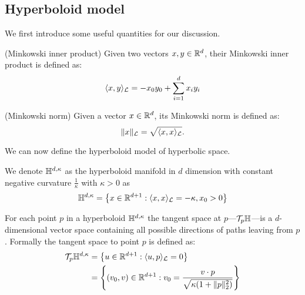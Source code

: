 

\subsection{Hyperboloid model}\label{sec:hyperboloidModel}
We first introduce some useful quantities for our discussion.

\begin{definition}(Minkowski inner product) \label{def:minkowskiInnerProduct}
    Given two vectors $x,y \in \mathbb{R}^d$, their Minkowski inner product is defined as:
    \begin{equation*}
        \langle x, y \rangle_{\mathcal{L}} = -x_0y_0+\sum_{i=1}^d x_iy_i
    \end{equation*}    
\end{definition}

\begin{definition}(Minkowski norm) \label{def:minkowskiNorm}
    Given a vector $x \in \mathbb{R}^d$, its Minkowski norm is defined as:
    \begin{equation*}
        \|x\|_{\mathcal{L}} = \sqrt{\langle x, x \rangle_{\mathcal{L}}}.
    \end{equation*}
\end{definition}

We can now define the hyperboloid model of hyperbolic space.
\begin{definition}
    We denote $\mathbb{H}^{d,\kappa}$ as the hyperboloid manifold in $d$ dimension with constant negative curvature $\frac{1}{\kappa}$ with $\kappa>0$ as
    \begin{equation*}
        \mathbb{H}^{d,\kappa} = \left\{x \in \mathbb{R}^{d+1} : \langle x, x \rangle_{\mathcal{L}} = -\kappa, x_0 > 0\right\}
    \end{equation*}
\end{definition}



For each point $p$ in a hyperboloid $\mathbb{H}^{d,\kappa}$ the tangent space at $p$---$\mathcal{T}_p\mathbb{H}$---is a $d$-dimensional vector space containing all possible directions of paths leaving from $p$. 
Formally the tangent space to point $p$ is defined as:
\begin{align}\label{eq:tangentSpace}
    \mathcal{T}_p\mathbb{H}^{d,\kappa} 
    &= \left\{u\in \mathbb{R}^{d+1} : \langle u, p \rangle_{\mathcal{L}} = 0\right\} \\
    &= \left\{(v_0,v) \in \mathbb{R}^{d+1} : v_0 = \frac{v \cdot p}{\sqrt{\kappa(1 + \|p\|^2_2)}}\right\}
\end{align}

